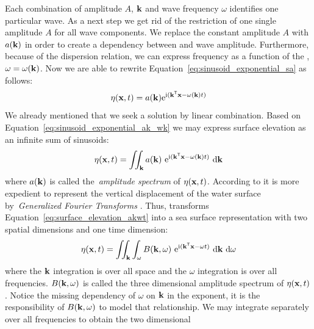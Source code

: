 Each combination of amplitude $A$, \wavevector $\mathbf{k}$ and wave frequency
$\omega$ identifies one particular wave. As a next step we get rid of the
restriction of one single amplitude $A$ for all wave components. We replace the
constant amplitude $A$ with $a(\mathbf{k})$ in order to create a dependency
between \wavevector and wave amplitude. Furthermore, because of the dispersion
relation, we can express frequency as a function of the \wavevector, $\omega =
\omega(\mathbf{k})$. Now we are able to rewrite
Equation~\ref{eq:sinusoid_exponential_sa} as follows:
\begin{equation}
\label{eq:sinusoid_exponential_ak_wk}
\eta(\mathbf{x}, t) =
a(\mathbf{k})\mathrm{e}^{\mathrm{i}(\mathbf{k}^{\mathsf{T}}\mathbf{x}-
\omega(\mathbf{k})t)}
\end{equation}
%
We already mentioned that we seek a solution by linear combination. Based on
Equation~\ref{eq:sinusoid_exponential_ak_wk} we may express surface
elevation as an infinite sum of sinusoids:
\begin{equation}
\label{eq:surface_elevation_akwt}
 \eta(\mathbf{x}, t) = \iint_{\mathbf{k}}
a(\mathbf{k})~\mathrm{e}^{\mathrm{i}(\mathbf{k}^{\mathsf{T}}\mathbf{x}-
\omega(\mathbf{k})t)}~\mathrm{d}\mathbf{k}
\end{equation}
where $a(\mathbf{k})$ is called the~\emph{amplitude spectrum} of
$\eta(\mathbf{x}, t)$.
According to \citet{book:kinsman2002wind} it is more expedient to
represent the vertical displacement of the water surface by~\emph{Generalized
Fourier Transforms} \citep{book:lighthill1958}.
Thus, \citeauthor{book:kinsman2002wind} transforms Equation~\ref{eq:surface_elevation_akwt}
into a sea surface representation with two spatial dimensions and one time dimension:
%
\begin{equation}
\label{eq:surface_elevation_bkwt}
 \eta(\mathbf{x}, t) = \iint_{\mathbf{k}}\int_{\omega} B(\mathbf{k},
\omega)~\mathrm{e}^{\mathrm{i}(\mathbf{k}^{\mathsf{T}}\mathbf{x}-
\omega t)}~
\mathrm{d}\mathbf{k}~\mathrm{d}\omega
\end{equation}
where the $\mathbf{k}$ integration is over all \wavenumber space and the $\omega$
integration is over all frequencies. $B(\mathbf{k},\omega)$ is called the
three dimensional amplitude spectrum of $\eta(\mathbf{x}, t)$. Notice the missing
dependency of $\omega$ on $\mathbf{k}$ in the exponent, it is the responsibility
of $B(\mathbf{k},\omega)$ to model that relationship.
We may integrate separately over all frequencies to obtain the two dimensional
